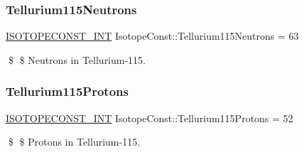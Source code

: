 \subsubsection{\texorpdfstring{Tellurium115\+Neutrons}{Tellurium115Neutrons}}
{\footnotesize\ttfamily \mbox{\hyperlink{group___isotope_const-_macros_ga5f18360b3e99483a35c32d789e62621c}{I\+S\+O\+T\+O\+P\+E\+C\+O\+N\+S\+T\+\_\+\+I\+NT}} Isotope\+Const\+::\+Tellurium115\+Neutrons = 63}

\$ \$ Neutrons in Tellurium-\/115. \mbox{\label{group___isotope_const-_tellurium-_te115_gaafb60d8a9b8c8210e38ec4c1809bca9d}} 
\subsubsection{\texorpdfstring{Tellurium115\+Protons}{Tellurium115Protons}}
{\footnotesize\ttfamily \mbox{\hyperlink{group___isotope_const-_macros_ga5f18360b3e99483a35c32d789e62621c}{I\+S\+O\+T\+O\+P\+E\+C\+O\+N\+S\+T\+\_\+\+I\+NT}} Isotope\+Const\+::\+Tellurium115\+Protons = 52}

\$ \$ Protons in Tellurium-\/115. 